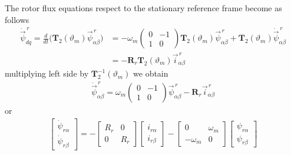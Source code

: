 \documentclass[11pt,a4paper]{scrartcl}
\numberwithin{equation}{section}
\theoremstyle{it}
\theoremstyle{definition}
\begin{document}
\begin{onehalfspace}
The rotor flux equations respect to the stationary reference frame become as 
follows
\begin{equation}\label{im_eq_17}
	\begin{aligned}
		\dot{\vec{\psi}}_{dq}^{\,r}=\frac{d}{dt}\Bigg(\mathbf{T}_2(\vartheta_m) 
		{\vec{\psi}}_{\alpha\beta}^{\,r}\Bigg)&=-\omega_m\begin{pmatrix}
			0&-1\\1&0\end{pmatrix}\mathbf{T}_2(\vartheta_m){\vec{\psi}}_{\alpha\beta}^{\,r}
		+\mathbf{T}_2(\vartheta_m)\dot{\vec{\psi}}_{\alpha\beta}^{\,r}\\[8pt]
		&=-\mathbf{R}_r\mathbf{T}_2(\vartheta_m){\vec{i}}_{\alpha\beta}^{\,r}
	\end{aligned}
\end{equation}
multiplying left side by $\mathbf{T}_2^{-1}(\vartheta_m)$ we obtain
\begin{equation}\label{im_eq_18}
	\begin{aligned}
		\dot{\vec{\psi}}_{\alpha\beta}^{\,r}=\omega_m\begin{pmatrix} 
			0&-1\\1&0\end{pmatrix} 
		{\vec{\psi}}_{\alpha\beta}^{\,r}-\mathbf{R}_r{\vec{i}}_{\alpha\beta}^{\,r}
	\end{aligned}
\end{equation}
or
\begin{equation}\label{im_eq_19}
	\begin{aligned}
		\left[
		\begin{matrix}
			\dot{\psi}_{r\alpha} \\[6pt]
			\dot{\psi}_{r\beta}
		\end{matrix} \right] = -
		\left[
		\begin{matrix}
			R_r & 0 \\[6pt]
			0 & R_r 
		\end{matrix} \right]
		\left[
		\begin{matrix}
			i_{r\alpha} \\[6pt]
			i_{r\beta}
		\end{matrix} \right] - 
		\left[
		\begin{matrix}
			0 & \omega_m \\[6pt]
			- \omega_m & 0
		\end{matrix} \right]
		\left[
		\begin{matrix}
			{\psi}_{r\alpha} \\[6pt]
			{\psi}_{r\beta}
		\end{matrix} \right]
	\end{aligned}
\end{equation}



\end{onehalfspace}
\end{document}
